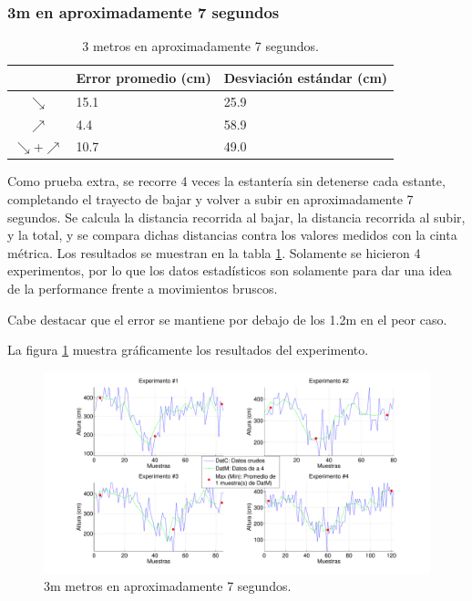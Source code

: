 \documentclass[main]{subfiles}
\begin{document}
\subsubsection{3m en aproximadamente 7 segundos}

\begin{table}
\vspace{-35pt}
\begin{tabular}{c|p{50pt}|p{50pt}|} 
\cline{2-3}
  & Error promedio (cm) & Desviación estándar (cm)\\ \hline
\multicolumn{1}{|c|}{$\searrow$} & 15.1 & 25.9 \\ \hline
\multicolumn{1}{|c|}{$\nearrow$} & 4.4 &  58.9 \\ \hline
\multicolumn{1}{|c|}{$\searrow$+$\nearrow$} & 10.7 & 49.0 \\ \hline
\end{tabular}
\caption{3 metros en aproximadamente 7 segundos.}
\label{tab:ruido-rms}
\vspace{-15pt}
\end{table}
Como prueba extra, se recorre 4 veces la estantería sin detenerse cada estante, completando el trayecto de bajar y volver a subir en aproximadamente 7 segundos. Se calcula la distancia recorrida al bajar, la distancia recorrida al subir, y la total, y se compara dichas distancias contra los valores medidos con la cinta métrica. Los resultados se muestran en la tabla \ref{tab:ruido-rms}. Solamente se hicieron 4 experimentos, por lo que los datos estadísticos son solamente para dar una idea de la performance frente a movimientos bruscos.

Cabe destacar que el error se mantiene por debajo de los 1.2m en el peor caso.

La figura \ref{fig:estante_veloz.pdf} muestra gráficamente los resultados del experimento.

\begin{figure}[H]
\centering
  \includegraphics[width=1.1\textwidth]{./pics_barom/estante_veloz.pdf}
  \caption{3m metros en aproximadamente 7 segundos.}
  \label{fig:estante_veloz.pdf}
\end{figure}
\end{document}

